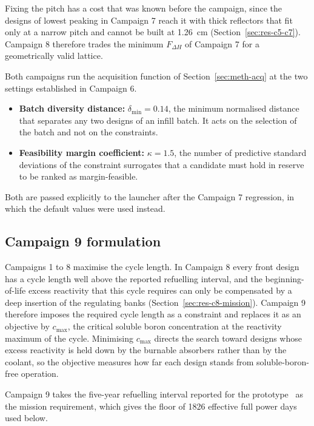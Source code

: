 Fixing the pitch has a cost that was known before the campaign, since
the designs of lowest peaking in Campaign 7 reach it with thick
reflectors that fit only at a narrow pitch and cannot be built at
\SI{1.26}{cm} (Section~\ref{sec:res-c5-c7}). Campaign 8 therefore
trades the minimum $F_{\Delta H}$ of Campaign 7 for a geometrically
valid lattice.

Both campaigns run the acquisition function of
Section~\ref{sec:meth-acq} at the two settings established in Campaign
6.

\begin{itemize}
  \item \textbf{Batch diversity distance:} $\delta_\mathrm{min} = 0.14$,
        the minimum normalised distance that separates any two designs
        of an infill batch. It acts on the selection of the batch and
        not on the constraints.

  \item \textbf{Feasibility margin coefficient:} $\kappa = 1.5$, the
        number of predictive standard deviations of the constraint
        surrogates that a candidate must hold in reserve to be ranked
        as margin-feasible.
\end{itemize}

Both are passed explicitly to the launcher after the Campaign 7
regression, in which the default values were used instead.

\subsection{Campaign 9 formulation}
\label{sec:meth-c9}

Campaigns 1 to 8 maximise the cycle length. In Campaign 8 every front
design has a cycle length well above the reported refuelling interval,
and the beginning-of-life excess reactivity that this cycle requires
can only be compensated by a deep insertion of the regulating banks
(Section~\ref{sec:res-c8-mission}). Campaign 9 therefore imposes the
required cycle length as a constraint and replaces it as an objective
by $c_\mathrm{max}$, the critical soluble boron concentration at the
reactivity maximum of the cycle. Minimising $c_\mathrm{max}$ directs the
search toward designs whose excess reactivity is held down by the
burnable absorbers rather than by the coolant, so the objective
measures how far each design stands from soluble-boron-free operation.

Campaign 9 takes the five-year refuelling interval reported for the
prototype~\cite{dinizcosta_2017} as the mission requirement, which
gives the floor of 1826 effective full power days used below.

